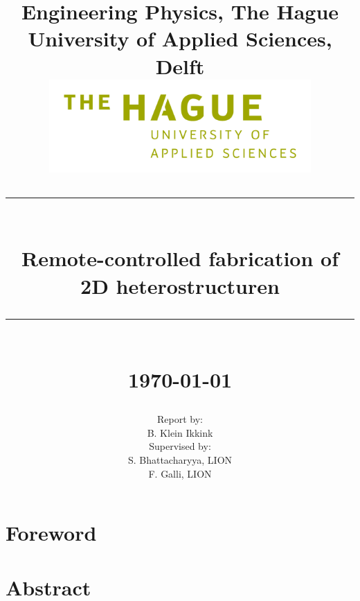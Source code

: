 \documentclass[11pt]{article}
\newcommand{\HRule}[1]{\rule{\linewidth}{#1}}
\begin{document}
\date{}

\title{ \normalsize Engineering Physics, The Hague University of Applied Sciences, Delft
		\\ [1.0cm]
		\includegraphics[width=100mm]{img/cover/hhs_en_groen_hex.png}  %
		\HRule{2pt} \\
		\LARGE \textbf{Remote-controlled fabrication of 2D heterostructuren} %
		\HRule{2pt} \\ [0.5cm]
		\normalsize \today \vspace*{5\baselineskip}}
		
\date{}

\author{
        Report by:\\
		B. Klein Ikkink            \\[1cm]
		 Supervised by:        \\
		 S. Bhattacharyya, LION \\
		 F. Galli, LION \\
		 }
		 
\maketitle
{}

\clearpage
\section*{Foreword}
\clearpage

\section*{Abstract}
\clearpage
\end{document}
